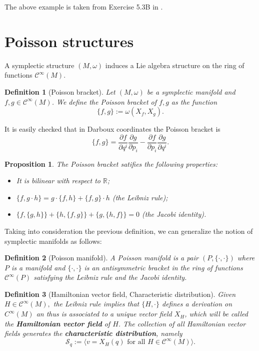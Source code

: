 \documentclass[12pt]{article}
\newtheorem{prop}{Proposition}[section]
\newtheorem{Def}{Definition}[section]
\newcommand{\sectiontitle}{section}
\newcommand{\setsectiontitle}[1]{\renewcommand{\sectiontitle}{\footnotesize\textit{#1}}}
\begin{document}
The above example is taken from Exercise 5.3B in \cites{abraham2008foundations}.



\section{Poisson structures}\label{Poisson}
\setsectiontitle{POISSON STRUCTURES}
A symplectic structure $(M,\omega)$ induces a Lie algebra structure on the ring of functions $\mathcal{C}^\infty(M)$.\\

\begin{Def}[Poisson bracket] Let $(M,\omega)$ be a symplectic manifold and $f, g \in \mathcal{C}^\infty(M)$. We define the Poisson bracket of $f,g$ as the function $$\{f,g\} := \omega(X_f,X_g).$$
\end{Def}

It is easily checked that in Darboux coordinates  the Poisson bracket is $$\{f,g\} = \frac{\partial f}{\partial q^i}\frac{\partial g}{\partial p_i}- \frac{\partial f}{\partial p_i} \frac{\partial g}{\partial q^i}.$$


\begin{prop} The Poisson bracket satifies the following properties:
\begin{itemize}
\item[i)] It is bilinear with respect to $\mathbb{R}$;
\item[ii)]  $\{f,g\cdot h\} = g \cdot \{f,h\} +\{f,g\} \cdot h $ (the Leibniz rule);
\item[iii)] $\{f,\{g,h\}\} + \{h,\{f,g\}\} + \{g,\{h,f\}\} = 0$ (the Jacobi identity).
\end{itemize}
\end{prop}

Taking into consideration the previous definition, we can generalize the notion of symplectic manifolds as follows:\\

\begin{Def}[Poisson manifold] A Poisson manifold is a pair $(P, \{ \cdot, \cdot \})$ where $P$ is a manifold and $\{ \cdot , \cdot \}$ is an antisymmetric bracket in the ring of functions $\mathcal{C}^\infty(P)$ satisfying the Leibniz rule and the Jacobi identity.\\
\end{Def}
\begin{Def}[Hamiltonian vector field, Characteristic distribution] Given $H \in \mathcal{C}^\infty(M),$ the Leibniz rule implies that $\{H,\cdot\}$ defines a derivation on $C^\infty(M)$ an thus is associated to a unique vector field $X_H$, which will be called the \textbf{Hamiltonian vector field} of $H$. The collection of all Hamiltonian vector fields generates the \textbf{characteristic distribution}, namely $$\mathcal{S}_q:= \langle v = X_H(q) \,\, \text{for all} \,\, H \in \mathcal{C}^\infty(M)\rangle.$$
\end{Def}
\end{document}
